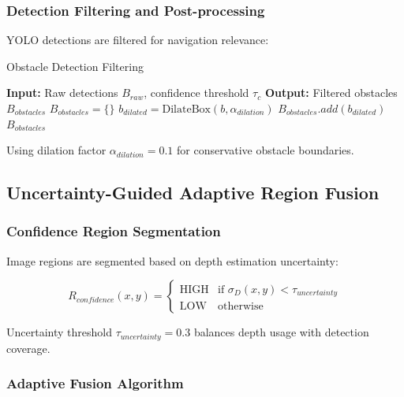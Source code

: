 \documentclass[12pt,oneside]{book}
\begin{document}
\subsubsection{Detection Filtering and Post-processing}

YOLO detections are filtered for navigation relevance:

\begin{algorithm}
\caption{Obstacle Detection Filtering}
\begin{algorithmic}
\STATE \textbf{Input:} Raw detections $B_{raw}$, confidence threshold $\tau_c$
\STATE \textbf{Output:} Filtered obstacles $B_{obstacles}$
\STATE $B_{obstacles} = \{\}$
        \STATE $b_{dilated} = \text{DilateBox}(b, \alpha_{dilation})$
        \STATE $B_{obstacles}.add(b_{dilated})$
    \ENDIF
\ENDFOR
\RETURN $B_{obstacles}$
\end{algorithmic}
\end{algorithm}

Using dilation factor $\alpha_{dilation} = 0.1$ for conservative obstacle boundaries.

\subsection{Uncertainty-Guided Adaptive Region Fusion}

\subsubsection{Confidence Region Segmentation}

Image regions are segmented based on depth estimation uncertainty:

\begin{equation}
R_{confidence}(x,y) = \begin{cases}
\text{HIGH} & \text{if } \sigma_D(x,y) < \tau_{uncertainty} \\
\text{LOW} & \text{otherwise}
\end{cases}
\label{eq:confidence_segmentation}
\end{equation}

Uncertainty threshold $\tau_{uncertainty} = 0.3$ balances depth usage with detection coverage.

\subsubsection{Adaptive Fusion Algorithm}
\end{document}
